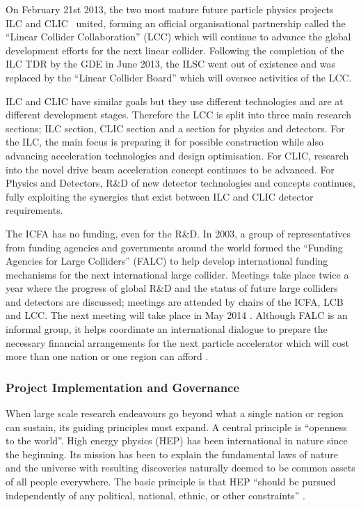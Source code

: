 On February 21st 2013, the two most mature future particle physics projects \textemdash \, ILC and CLIC \textemdash \, united, forming an official organisational partnership called the ``Linear Collider Collaboration'' (LCC) which will continue to advance the global development efforts for the next linear collider. \cite{LCC:Press1} Following the completion of the ILC TDR by the GDE in June 2013, the ILSC went out of existence and was replaced by the ``Linear Collider Board'' which will oversee activities of the LCC.

ILC and CLIC have similar goals but they use different technologies and are at different development stages. Therefore the LCC is split into three main research sections; ILC section, CLIC section and a section for physics and detectors. For the ILC, the main focus is preparing it for possible construction while also advancing acceleration technologies and design optimisation. For CLIC, research into the novel drive beam acceleration concept continues to be advanced.  For Physics and Detectors, R\&D of new detector technologies and concepts continues, fully exploiting the synergies that exist between ILC and CLIC detector requirements. \cite{LCC:Press1}

The ICFA has no funding, even for the R\&D. In 2003, a group of representatives from funding agencies and governments around the world formed the ``Funding Agencies for Large Colliders'' (FALC) to help develop international funding mechanisms for the next international large collider. Meetings take place twice a year where the progress of global R\&D and the status of future large colliders and detectors are discussed; meetings are attended by chairs of the ICFA, LCB and LCC. The next meeting will take place in May 2014 \cite{Funding:FALC:History}. Although FALC is an informal group, it helps coordinate an international dialogue to prepare the necessary financial arrangements for the next particle accelerator which will cost more than one nation or one region can afford \cite{Funding:FALC:Report}.

\subsubsection{Project Implementation and Governance}

When large scale research endeavours go beyond what a single nation or region can sustain, its guiding principles must expand. A central principle is ``openness to the world''. High energy physics (HEP) has been international in nature since the beginning. Its mission has been to explain the fundamental laws of nature and the universe with resulting discoveries naturally deemed to be common assets of all people everywhere. The basic principle is that HEP ``should be pursued independently of any political, national, ethnic, or other constraints'' \cite{ILC:PIPReport}.

